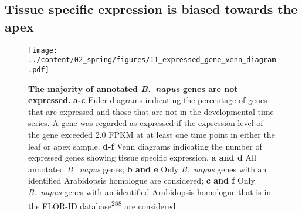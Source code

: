 \documentclass[12pt,]{book}
\begin{document}
\subsection{Tissue specific expression is biased towards the
apex}\label{section:spring:tissuespecfic}

\begin{figure}[htbp]
\centering
\texttt{[image: ../content/02\_spring/figures/11\_expressed\_gene\_venn\_diagram.pdf]}
\caption{\textbf{The majority of annotated \emph{B.~napus} genes are not
expressed.} \textbf{a-c} Euler diagrams indicating the percentage of
genes that are expressed and those that are not in the developmental
time series. A gene was regarded as expressed if the expression level of
the gene exceeded 2.0 FPKM at at least one time point in either the leaf
or apex sample. \textbf{d-f} Venn diagrams indicating the number of
expressed genes showing tissue specific expression. \textbf{a and d} All
annotated \emph{B.~napus} genes; \textbf{b and e} Only \emph{B.~napus}
genes with an identified Arabidopsis homologue are considered; \textbf{c
and f} Only \emph{B.~napus} genes with an identified Arabidopsis
homologue that is in the FLOR-ID database\textsuperscript{288} are
considered.}\label{figure:211:venn}
\end{figure}
\end{document}
